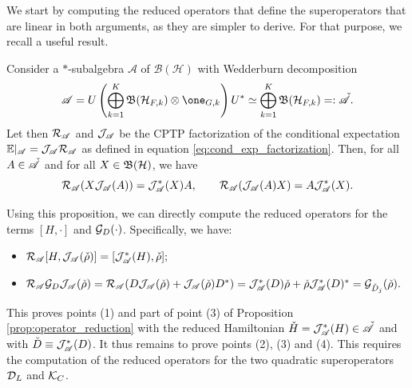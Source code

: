\documentclass[aihp,12pt]{imsart}
\begin{document}
We start by computing the reduced operators that define the superoperators that are linear in both arguments, as they are simpler to derive. For that purpose, we recall a useful result.
\begin{proposition}
\label{prop:combining_reduction_injection}
    Consider a $*$-subalgebra $\mathscr{A}$ of $\mathcal{B(H)}$ with Wedderburn decomposition $$\As = U\left(\bigoplus_{k=1}^K \Bf(\Hc_{F,k})\otimes \one_{G,k} \right)U^* \simeq \bigoplus_{k=1}^K \Bf(\Hc_{F,k}) =: \check{\As}.$$ Let then $\mathcal{R}_{\mathscr{A}}$ and $\mathcal{J}_{\mathscr{A}}$ be the CPTP factorization of the conditional expectation $\mathbb{E}|_\mathscr{A} = \mathcal{J}_{\mathscr{A}}\mathcal{R}_{\mathscr{A}}$ as defined in equation \eqref{eq:cond_exp_factorization}. Then, for all $A\in\check{\mathscr{A}}$ and for all $X\in\mathfrak{B}(\mathcal{H})$, we have  
    \begin{equation}
    \mathcal{R}_{\mathscr{A}}(X \mathcal{J}_{\mathscr{A}}(A)) = \mathcal{J}_{\mathscr{A}}^*(X) A, \qquad 
    \mathcal{R}_{\mathscr{A}}(\mathcal{J}_{\mathscr{A}}(A) X) = A \mathcal{J}_{\mathscr{A}}^*(X).
    \end{equation}
\end{proposition}

Using this proposition, we can directly compute the reduced operators for the terms $[H,\cdot]$ and $\mathcal{G}_{D}(\cdot)$. Specifically, we have: 
\begin{itemize}
    \item $\mathcal{R}_{\mathscr{A}}[H,\mathcal{J}_{\mathscr{A}}(\check{\rho})] = [\mathcal{J}_{\mathscr{A}}^*(H),\check{\rho}];$ 
    \item $\mathcal{R}_{\mathscr{A}}\mathcal{G}_{D} \mathcal{J}_{\mathscr{A}}(\check{\rho}) = \mathcal{R}_{\mathscr{A}}(D \mathcal{J}_{\mathscr{A}}(\check{\rho}) + \mathcal{J}_{\mathscr{A}}(\check{\rho}) D^*) = \mathcal{J}_{\mathscr{A}}^*(D)\check{\rho} + \check{\rho} \mathcal{J}_{\mathscr{A}}^*(D)^* = \mathcal{G}_{\check{D}_j}(\check{\rho}).$
\end{itemize}
This proves points (1) and part of point (3) of Proposition \ref{prop:operator_reduction} with the reduced Hamiltonian $\check{H} = \mathcal{J}_{\mathscr{A}}^*(H)\in\check{\mathscr{A}}$ and with $\check{D} \equiv \mathcal{J}_{\mathscr{A}}^*(D)$.
It thus remains to prove points (2), (3) and (4). This requires the computation of the reduced operators for the two quadratic superoperators $\mathcal{D}_{L}$ and $\mathcal{K}_{C}$.
\end{document}
